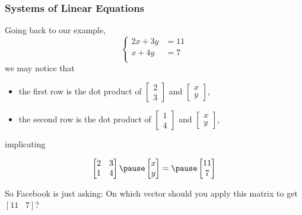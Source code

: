 \documentclass{beamer}
\begin{document}
\begin{frame}
  \frametitle{Systems of Linear Equations}
  Going back to our example,
    \[
      \begin{cases}
        2x  +  3y & =  11 \\
        x +  4y & =  7 \\
      \end{cases}
    \]
    we may notice that \pause
    \begin{itemize}
        \item the first row is the dot product of $\begin{bmatrix}2\\3    \end{bmatrix}$ and $\begin{bmatrix}x\\y    \end{bmatrix}$, 
        \pause
        \item the second row is the dot product of $\begin{bmatrix}1\\4    \end{bmatrix}$ and $\begin{bmatrix}x\\y    \end{bmatrix}$, 
    \end{itemize}

\pause

implicating \pause 

\[
\begin{bmatrix}
2 & 3 \\ 1 & 4
\end{bmatrix}
\pause
\begin{bmatrix}
    x \\ y
\end{bmatrix}
=
\pause
\begin{bmatrix}
11 \\ 7    
\end{bmatrix}
\]

\pause

{\tiny So Facebook is just asking: On which vector  should you apply this matrix to get $[11\,\,\,\,\,7]$?}

\end{frame}
\end{document}
